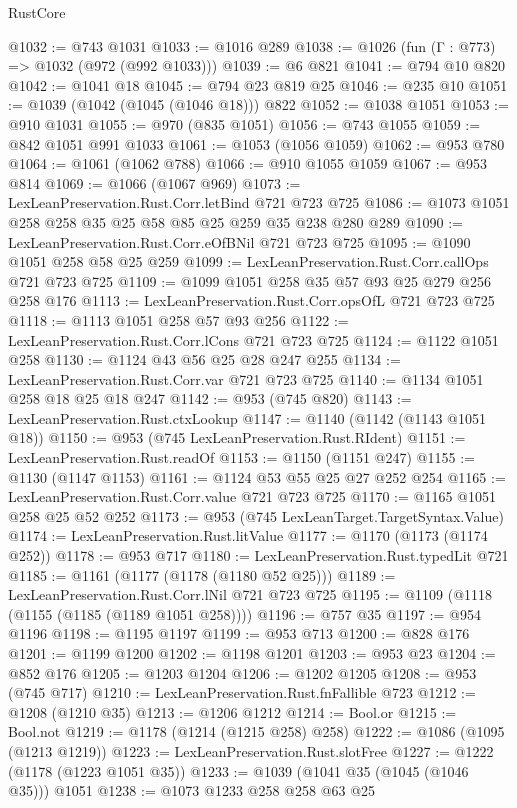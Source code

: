\begin{lexlean}{RustCore}
\begin{coremodule}
@1032 := @743 @1031
@1033 := @1016 @289
@1038 := @1026 (fun (Γ : @773) => @1032 (@972 (@992 @1033)))
@1039 := @6 @821
@1041 := @794 @10 @820
@1042 := @1041 @18
@1045 := @794 @23 @819 @25
@1046 := @235 @10
@1051 := @1039 (@1042 (@1045 (@1046 @18))) @822
@1052 := @1038 @1051
@1053 := @910 @1031
@1055 := @970 (@835 @1051)
@1056 := @743 @1055
@1059 := @842 @1051 @991 @1033
@1061 := @1053 (@1056 @1059)
@1062 := @953 @780
@1064 := @1061 (@1062 @788)
@1066 := @910 @1055 @1059
@1067 := @953 @814
@1069 := @1066 (@1067 @969)
@1073 := LexLeanPreservation.Rust.Corr.letBind @721 @723 @725
@1086 := @1073 @1051 @258 @258 @35 @25 @58 @85 @25 @259 @35 @238 @280 @289
@1090 := LexLeanPreservation.Rust.Corr.eOfBNil @721 @723 @725
@1095 := @1090 @1051 @258 @58 @25 @259
@1099 := LexLeanPreservation.Rust.Corr.callOps @721 @723 @725
@1109 := @1099 @1051 @258 @35 @57 @93 @25 @279 @256 @258 @176
@1113 := LexLeanPreservation.Rust.Corr.opsOfL @721 @723 @725
@1118 := @1113 @1051 @258 @57 @93 @256
@1122 := LexLeanPreservation.Rust.Corr.lCons @721 @723 @725
@1124 := @1122 @1051 @258
@1130 := @1124 @43 @56 @25 @28 @247 @255
@1134 := LexLeanPreservation.Rust.Corr.var @721 @723 @725
@1140 := @1134 @1051 @258 @18 @25 @18 @247
@1142 := @953 (@745 @820)
@1143 := LexLeanPreservation.Rust.ctxLookup
@1147 := @1140 (@1142 (@1143 @1051 @18))
@1150 := @953 (@745 LexLeanPreservation.Rust.RIdent)
@1151 := LexLeanPreservation.Rust.readOf
@1153 := @1150 (@1151 @247)
@1155 := @1130 (@1147 @1153)
@1161 := @1124 @53 @55 @25 @27 @252 @254
@1165 := LexLeanPreservation.Rust.Corr.value @721 @723 @725
@1170 := @1165 @1051 @258 @25 @52 @252
@1173 := @953 (@745 LexLeanTarget.TargetSyntax.Value)
@1174 := LexLeanPreservation.Rust.litValue
@1177 := @1170 (@1173 (@1174 @252))
@1178 := @953 @717
@1180 := LexLeanPreservation.Rust.typedLit @721
@1185 := @1161 (@1177 (@1178 (@1180 @52 @25)))
@1189 := LexLeanPreservation.Rust.Corr.lNil @721 @723 @725
@1195 := @1109 (@1118 (@1155 (@1185 (@1189 @1051 @258))))
@1196 := @757 @35
@1197 := @954 @1196
@1198 := @1195 @1197
@1199 := @953 @713
@1200 := @828 @176
@1201 := @1199 @1200
@1202 := @1198 @1201
@1203 := @953 @23
@1204 := @852 @176
@1205 := @1203 @1204
@1206 := @1202 @1205
@1208 := @953 (@745 @717)
@1210 := LexLeanPreservation.Rust.fnFallible @723
@1212 := @1208 (@1210 @35)
@1213 := @1206 @1212
@1214 := Bool.or
@1215 := Bool.not
@1219 := @1178 (@1214 (@1215 @258) @258)
@1222 := @1086 (@1095 (@1213 @1219))
@1223 := LexLeanPreservation.Rust.slotFree
@1227 := @1222 (@1178 (@1223 @1051 @35))
@1233 := @1039 (@1041 @35 (@1045 (@1046 @35))) @1051
@1238 := @1073 @1233 @258 @258 @63 @25

\end{coremodule}
\end{lexlean}
